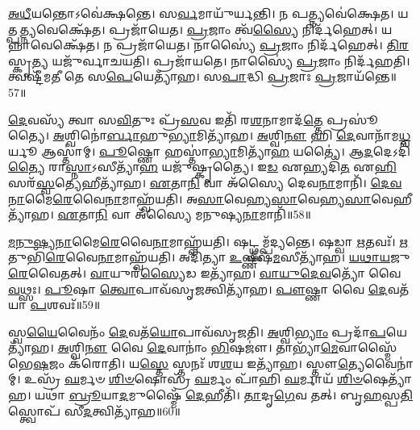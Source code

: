 \-\ul{𑌅}\-\-\ul{𑌧𑍀}\-𑌯𑌨𑍍𑌤𑍋𑌽𑌵𑍇॑𑌕𑍍𑌷𑌨𑍍𑌤𑍇। 
𑌸\-\ul{𑌰𑍍𑌵}\-𑌮𑌾𑌯𑍁᳴𑌰𑍍\mbox{}𑌯𑌨𑍍𑌤𑌿। 
𑌨 𑌪𑌤𑍍𑌨𑍍𑌯𑌵𑍇॑𑌕𑍍𑌷𑍇𑌤। 
𑌯𑌤𑍍𑌪\-\ul{𑌤𑍍𑌨𑍍𑌯}\-𑌵𑍇𑌕𑍍𑌷𑍇᳴𑌤। 
𑌪𑍍𑌰𑌜𑌾᳴𑌯𑍇𑌤। 
\-\ul{𑌪𑍍𑌰}\-𑌜𑌾𑌂 𑌤𑍍𑌵᳴\-\ul{𑌸𑍍𑌯𑍈} 𑌨𑌿𑌰𑍍𑌦᳴𑌹𑍇𑌤𑍍। 
𑌯𑌨𑍍𑌨𑌾𑌵𑍇𑌕𑍍𑌷𑍇᳴𑌤। 
𑌨 𑌪𑍍𑌰𑌜𑌾᳴𑌯𑍇𑌤। 
𑌨𑌾𑌸𑍍𑌯𑍈॑ \ul{𑌪𑍍𑌰}\-𑌜𑌾𑌂 𑌨𑌿𑌰𑍍𑌦᳴𑌹𑍇𑌤𑍍। 
\-\ul{𑌤𑌿}\-\-\ul{𑌰}\-𑌸𑍍𑌕𑍃\-\ul{𑌤𑍍𑌯} 𑌯𑌜𑍁᳴𑌰𑍍𑌵𑌾𑌚𑌯𑌤𑌿। 
𑌪𑍍𑌰𑌜𑌾᳴𑌯𑌤𑍇। 
𑌨𑌾𑌸𑍍𑌯𑍈॑ \ul{𑌪𑍍𑌰}\-𑌜𑌾𑌂 𑌨𑌿𑌰𑍍𑌦᳴𑌹𑌤𑌿। 
𑌤𑍍𑌵𑌷𑍍𑌟𑍀᳴𑌮𑌤𑍀 𑌤𑍇 𑌸\-\ul{𑌪𑍇}\-𑌯𑍇𑌤𑍍𑌯𑌾᳴𑌹। 
𑌸\-\ul{𑌪𑌾}\-𑌦𑍍𑌧𑌿 \ul{𑌪𑍍𑌰}\-𑌜𑌾𑌃 \ul{𑌪𑍍𑌰}\-𑌜𑌾𑌯᳴𑌨𑍍𑌤𑍇॥57॥

\-\ul{𑌦𑍇}\-𑌵𑌸𑍍𑌯᳴ 𑌤𑍍𑌵𑌾 𑌸\-\ul{𑌵𑌿}\-𑌤𑍁𑌃 𑌪𑍍𑌰᳴\-\ul{𑌸}\-𑌵 𑌇𑌤𑌿᳴ 𑌰\-\ul{𑌶}\-𑌨𑌾𑌮𑌾𑌦᳴\-\ul{𑌤𑍍𑌤𑍇} 𑌪𑍍𑌰𑌸𑍂॑𑌤𑍍𑌯𑍈। 
\-\ul{𑌅}\-𑌶𑍍𑌵𑌿𑌨𑍋॑\-\ul{𑌰𑍍𑌬𑌾}\-𑌹𑍁\-\ul{𑌭𑍍𑌯𑌾}\-𑌮𑌿𑌤𑍍𑌯𑌾᳴𑌹। 
\-\ul{𑌅}\-𑌶𑍍𑌵𑌿\-\ul{𑌨𑍗} 𑌹𑌿 \ul{𑌦𑍇}\-𑌵𑌾𑌨𑌾᳴𑌮\-\ul{𑌧𑍍𑌵}\-𑌰𑍍𑌯𑍂 𑌆𑌸𑍍𑌤𑌾॑𑌮𑍍। 
\-\ul{𑌪𑍂}\-𑌷𑍍𑌣𑍋 𑌹𑌸𑍍𑌤𑌾॑\-\ul{𑌭𑍍𑌯𑌾}\-𑌮𑌿𑌤𑍍𑌯𑌾᳴\-\ul{𑌹} 𑌯𑌤𑍍𑌯𑍈॑। 
𑌆\-\ul{𑌦}\-𑌦𑍇𑌽𑌦𑌿᳴\-\ul{𑌤𑍍𑌯𑍈} 𑌰𑌾\-\ul{𑌸𑍍𑌨𑌾}\-𑌽𑌸𑍀𑌤𑍍𑌯𑌾᳴\-\ul{𑌹} 𑌯𑌜𑍁᳴𑌷𑍍𑌕𑍃𑌤𑍍𑌯𑍈। 
𑌇\-\ul{𑌡} 𑌏𑌹𑍍𑌯𑌦𑌿᳴\-\ul{𑌤} 𑌏\-\ul{𑌹𑌿} 𑌸𑌰᳴\-\ul{𑌸𑍍𑌵}\-𑌤𑍍𑌯𑍇𑌹𑍀𑌤𑍍𑌯𑌾᳴𑌹। 
\-\ul{𑌏}\-𑌤𑌾\-\ul{𑌨𑌿} 𑌵𑌾 𑌅᳴𑌸𑍍𑌯𑍈 𑌦𑍇𑌵\-\ul{𑌨𑌾}\-𑌮𑌾𑌨𑌿᳴। 
\-\ul{𑌦𑍇}\-\-\ul{𑌵}\-\-\ul{𑌨𑌾}\-𑌮𑍈\-\ul{𑌰𑍇}\-𑌵𑍈\-\ul{𑌨𑌾}\-𑌮𑌾𑌹𑍍𑌵᳴𑌯𑌤𑌿। 
𑌅\-\ul{𑌸𑌾}\-𑌵𑍇𑌹𑍍𑌯\-\ul{𑌸𑌾}\-𑌵𑍇𑌹𑍍𑌯\-\ul{𑌸𑌾}\-𑌵𑍇𑌹𑍀𑌤𑍍𑌯𑌾᳴𑌹। 
\-\ul{𑌏}\-𑌤𑌾\-\ul{𑌨𑌿} 𑌵𑌾 𑌅᳴𑌸𑍍𑌯𑍈 𑌮𑌨𑍁𑌷𑍍𑌯\-\ul{𑌨𑌾}\-𑌮𑌾𑌨𑌿᳴॥58॥

\-\ul{𑌮}\-\-\ul{𑌨𑍁}\-\-\ul{𑌷𑍍𑌯}\-\-\ul{𑌨𑌾}\-𑌮𑍈\-\ul{𑌰𑍇}\-𑌵𑍈\-\ul{𑌨𑌾}\-𑌮𑌾𑌹𑍍𑌵᳴𑌯𑌤𑌿। 
𑌷𑌟𑍍𑌥𑍍𑌸𑌮𑍍𑌪᳴𑌦𑍍𑌯𑌨𑍍𑌤𑍇। 
𑌷𑌡𑍍𑌵𑌾 \ul{𑌋}\-𑌤𑌵𑌃᳴। 
\-\ul{𑌋}\-𑌤𑍁𑌭𑌿᳴\-\ul{𑌰𑍇}\-𑌵𑍈\-\ul{𑌨𑌾}\-𑌮𑌾𑌹𑍍𑌵᳴𑌯𑌤𑌿। 
𑌅𑌦𑌿᳴𑌤𑍍𑌯𑌾 \ul{𑌉}\-𑌷𑍍𑌣𑍀𑌷᳴\-\ul{𑌮}\-𑌸𑍀𑌤𑍍𑌯𑌾᳴𑌹। 
\-\ul{𑌯}\-\-\ul{𑌥𑌾}\-\-\ul{𑌯}\-𑌜𑍁\-\ul{𑌰𑍇}\-𑌵𑍈\-𑌤𑌤𑍍। 
\-\ul{𑌵𑌾}\-𑌯𑍁𑌰᳴\-\ul{𑌸𑍍𑌯𑍈}\-𑌡 𑌇𑌤𑍍𑌯𑌾᳴𑌹। 
\-\ul{𑌵𑌾}\-\-\ul{𑌯𑍁}\-\-\ul{𑌦𑍇}\-\-\ul{𑌵}\-𑌤𑍍𑌯𑍋᳴ 𑌵𑍈 \ul{𑌵}\-𑌥𑍍𑌸𑌃। 
\-\ul{𑌪𑍂}\-𑌷𑌾 \ul{𑌤𑍍𑌵𑍋}\-𑌪𑌾𑌵᳴𑌸𑍃\-\ul{𑌜}\-\-𑌤𑍍𑌵𑌿𑌤𑍍𑌯𑌾᳴𑌹। 
\-\ul{𑌪𑍗}\-𑌷𑍍𑌣𑌾 𑌵𑍈 \ul{𑌦𑍇}\-𑌵𑌤᳴𑌯𑌾 \ul{𑌪}\-𑌶𑌵𑌃᳴॥59॥

𑌸𑍍𑌵\-\ul{𑌯𑍈}\-𑌵𑍈𑌨𑌂᳴ \ul{𑌦𑍇}\-𑌵𑌤᳴\-\ul{𑌯𑍋}\-𑌪𑌾𑌵᳴𑌸𑍃𑌜𑌤𑌿। 
\-\ul{𑌅}\-𑌶𑍍𑌵𑌿\-\ul{𑌭𑍍𑌯𑌾𑌂} 𑌪𑍍𑌰𑌦𑌾᳴\-\ul{𑌪}\-𑌯𑍇𑌤𑍍𑌯𑌾᳴𑌹। 
\-\ul{𑌅}\-𑌶𑍍𑌵𑌿\-\ul{𑌨𑍗} 𑌵𑍈 \ul{𑌦𑍇}\-𑌵𑌾𑌨𑌾𑌂॑ \ul{𑌭𑌿}\-𑌷𑌜𑍗॑। 
𑌤𑌾𑌭𑍍𑌯𑌾᳴\-\ul{𑌮𑍇}\-𑌵𑌾𑌸𑍍𑌮𑍈᳴ 𑌭𑍇\-\ul{𑌷}\-𑌜𑌂 𑌕᳴𑌰𑍋𑌤𑌿। 
𑌯\-\ul{𑌸𑍍𑌤𑍇} 𑌸𑍍𑌤𑌨𑌃᳴ 𑌶\-\ul{𑌶}\-𑌯 𑌇𑌤𑍍𑌯𑌾᳴𑌹। 
𑌸𑍍𑌤𑍗\-\ul{𑌤𑍍𑌯𑍇}\-𑌵𑍈𑌨𑌾॑𑌮𑍍। 
𑌉𑌸𑍍𑌰᳴ \ul{𑌘}\-𑌰𑍍𑌮𑍞 \ul{𑌶𑌿}\-\-\ul{𑍞}\-𑌷𑍋𑌸𑍍𑌰᳴ \ul{𑌘}\-𑌰𑍍𑌮𑌂 𑌪𑌾᳴𑌹𑌿 \ul{𑌘}\-𑌰𑍍𑌮𑌾𑌯᳴ \ul{𑌶𑌿}\-\-\ul{𑍞}\-𑌷𑍇𑌤𑍍𑌯𑌾᳴𑌹। 
𑌯𑌥𑌾॑ \ul{𑌬𑍍𑌰𑍂}\-𑌯𑌾\-\ul{𑌦}\-𑌮𑍁𑌷𑍍𑌮𑍈᳴ \ul{𑌦𑍇}\-𑌹𑍀𑌤𑌿᳴। 
\-\ul{𑌤𑌾}\-𑌦𑍃\-\ul{𑌗𑍇}\-𑌵 𑌤𑌤𑍍। 
𑌬𑍃\-\ul{𑌹}\-𑌸𑍍𑌪\-\ul{𑌤𑌿}\-𑌸𑍍𑌤𑍍𑌵𑍋𑌪᳴ 𑌸𑍀\-\ul{𑌦}\-𑌤𑍍𑌵𑌿𑌤𑍍𑌯𑌾᳴𑌹॥60॥

